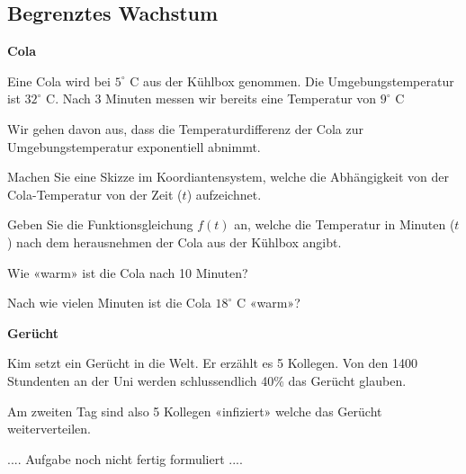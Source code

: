 
\subsection{Begrenztes Wachstum}


\bbwActAufgabenNr{} \textbf{Cola}

Eine Cola wird bei $5^\circ \textrm{ C}$ aus der Kühlbox genommen. Die
Umgebungstemperatur ist $32^\circ \textrm{ C}$. Nach 3 Minuten messen
wir bereits eine Temperatur von $9^\circ \textrm{ C}$ 

Wir gehen davon aus, dass die Temperaturdifferenz der Cola zur
Umgebungstemperatur exponentiell abnimmt.

\begin{bbwAufgabenBlock}
\item Machen Sie eine Skizze im Koordiantensystem, welche die
Abhängigkeit von der Cola-Temperatur von der Zeit ($t$) aufzeichnet.


\item Geben Sie die Funktionsgleichung $f(t)$ an, welche die
Temperatur in Minuten ($t$) nach dem herausnehmen der Cola aus der Kühlbox
angibt.


\item Wie «warm» ist die Cola nach 10 Minuten?


\item Nach wie vielen Minuten ist die Cola $18^\circ \textrm{ C}$
«warm»?


\end{bbwAufgabenBlock}


\platzFuerBerechnungenBisEndeSeite{}


\bbwActAufgabenNr{}  \textbf{Gerücht}

Kim setzt ein Gerücht in die Welt. Er erzählt es 5 Kollegen.
Von den 1400 Stundenten an der Uni werden schlussendlich 40\% das
Gerücht glauben.

Am zweiten Tag sind also 5 Kollegen «infiziert» welche das Gerücht
weiterverteilen.

.... Aufgabe noch nicht fertig formuliert ....
\newpage
